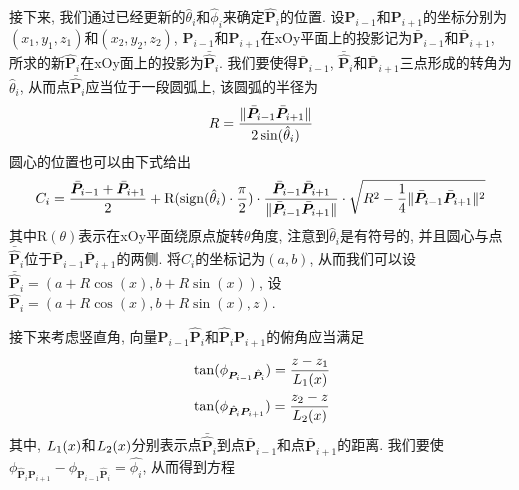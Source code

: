 \documentclass[utf8]{ctexart} %
\begin{document}
	 接下来, 我们通过已经更新的$\hat{\theta}_i$和$\hat{\phi}_i$来确定$\hat{\boldsymbol{P}}_i$的位置. 设$\boldsymbol{P}_{i-1}$和$\boldsymbol{P}_{i+1}$的坐标分别为$(x_1,y_1,z_1)$和$(x_2,y_2,z_2)$, $\boldsymbol{P}_{i-1}$和$\boldsymbol{P}_{i+1}$在xOy平面上的投影记为$\bar{\boldsymbol{P}}_{i-1}$和$\bar{\boldsymbol{P}}_{i+1}$, 所求的新$\hat{\boldsymbol{P}}_i$在xOy面上的投影为$\bar{\hat{\boldsymbol{P}}}_i$. 我们要使得$\bar{\boldsymbol{P}}_{i-1}$, $\bar{\hat{\boldsymbol{P}}}_i$和$\bar{\boldsymbol{P}}_{i+1}$三点形成的转角为$\hat{\theta}_i$, 从而点$\bar{\hat{\boldsymbol{P}}}_i$应当位于一段圆弧上, 该圆弧的半径为
	 \begin{equation}\label{R}
	 R = \frac{\Arrowvert\bar{\boldsymbol{P}}_{i-1}\bar{\boldsymbol{P}}_{i+1}\Arrowvert}{2\sin(\hat{\theta}_i)}
	 \end{equation}
	 圆心的位置也可以由下式给出
	 \begin{equation}\label{center}
	 C_i = \frac{\bar{\boldsymbol{P}}_{i-1}+\bar{\boldsymbol{P}}_{i+1}}2+\mathrm{R}(\mathrm{sign}(\hat{\theta}_i)\cdot\frac{\pi}2)\cdot\frac{\bar{\boldsymbol{P}}_{i-1}\bar{\boldsymbol{P}}_{i+1}}{\Arrowvert\bar{\boldsymbol{P}}_{i-1}\bar{\boldsymbol{P}}_{i+1}\Arrowvert}\cdot\sqrt{R^2-\frac14\Arrowvert\bar{\boldsymbol{P}}_{i-1}\bar{\boldsymbol{P}}_{i+1}\Arrowvert^2}
	 \end{equation}
	 其中$\mathrm{R}(\theta)$表示在xOy平面绕原点旋转$\theta$角度, 注意到$\hat{\theta}_i$是有符号的, 并且圆心与点$\bar{\hat{\boldsymbol{P}}}_i$位于$\bar{\boldsymbol{P}}_{i-1}\bar{\boldsymbol{P}}_{i+1}$的两侧. 将$C_i$的坐标记为$(a,b)$, 从而我们可以设$\bar{\hat{\boldsymbol{P}}}_i=(a+R\cos(x),b+R\sin(x))$, 设$\hat{\boldsymbol{P}}_i=(a+R\cos(x),b+R\sin(x),z)$. \par 
	 接下来考虑竖直角, 向量$\boldsymbol{P}_{i-1}\hat{\boldsymbol{P}}_i$和$\hat{\boldsymbol{P}}_i\boldsymbol{P}_{i+1}$的俯角应当满足
	 \begin{equation}
	 \begin{aligned}
	 &\tan(\phi_{\boldsymbol{P}_{i-1}\hat{\boldsymbol{P}}_i}) = \frac{z-z_1}{\boldmath{L}_1(x)}\\
	 &\tan(\phi_{\hat{\boldsymbol{P}}_i\boldsymbol{P}_{i+1}}) = \frac{z_2-z}{\boldmath{L}_2(x)}
	 \end{aligned}
	 \end{equation}
	 其中, $\boldmath{L}_1(x)$和$\boldmath{L}_2(x)$分别表示点$\bar{\hat{\boldsymbol{P}}}_i$到点$\bar{\boldsymbol{P}}_{i-1}$和点$\bar{\boldsymbol{P}}_{i+1}$的距离. 我们要使$\phi_{\hat{\boldsymbol{P}}_i\boldsymbol{P}_{i+1}}-\phi_{\boldsymbol{P}_{i-1}\hat{\boldsymbol{P}}_i}=\hat{\phi_i}$, 从而得到方程
\end{document}
